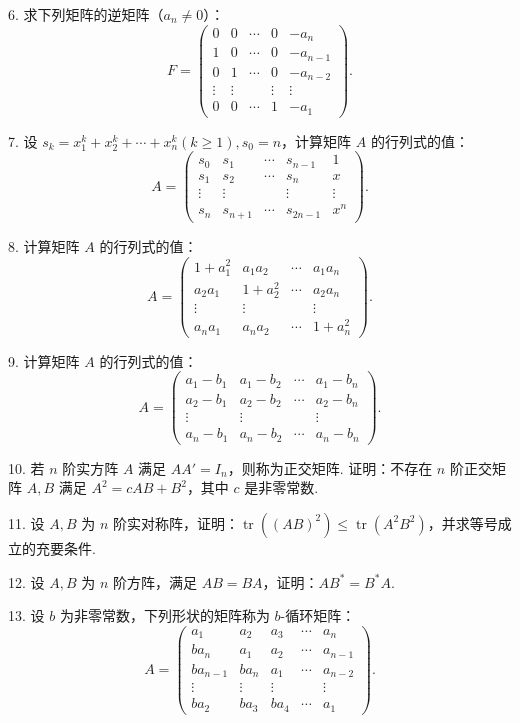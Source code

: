 \documentclass[UTF8, 12pt, fontset=fandol, oneside]{ctexart}
\begin{document}
6. 求下列矩阵的逆矩阵（$a_n\ne0$）：
\[
F=
\left(
\begin{array}{ccccc}
0 & 0 & \cdots & 0 & -a_n\\
1 & 0 & \cdots & 0 & -a_{n-1}\\
0 & 1 & \cdots & 0 & -a_{n-2}\\
\vdots & \vdots & & \vdots & \vdots\\
0 & 0 & \cdots & 1 & -a_1
\end{array}
\right).
\]

7. 设 $s_k=x_1^k+x_2^k+\cdots+x_n^k(k\ge1),s_0=n$，计算矩阵 $A$ 的行列式的值：
\[
A=
\left(
\begin{array}{ccccc}
s_0 & s_1 & \cdots & s_{n-1} & 1\\
s_1 & s_2 & \cdots & s_n & x\\
\vdots & \vdots & & \vdots & \vdots\\
s_n & s_{n+1} & \cdots & s_{2n-1} & x^n
\end{array}
\right).
\]

8. 计算矩阵 $A$ 的行列式的值：
\[
A=
\left(
\begin{array}{cccc}
1+a_1^2 & a_1a_2 & \cdots & a_1a_n\\
a_2a_1 & 1+a_2^2 & \cdots & a_2a_n\\
\vdots & \vdots & & \vdots\\
a_na_1 & a_na_2 & \cdots & 1+a_n^2
\end{array}
\right).
\]

9. 计算矩阵 $A$ 的行列式的值：
\[
A=
\left(
\begin{array}{cccc}
a_1-b_1 & a_1-b_2 & \cdots & a_1-b_n\\
a_2-b_1 & a_2-b_2 & \cdots & a_2-b_n\\
\vdots & \vdots & & \vdots\\
a_n-b_1 & a_n-b_2 & \cdots & a_n-b_n
\end{array}
\right).
\]

10. 若 $n$ 阶实方阵 $A$ 满足 $AA'=I_n$，则称为正交矩阵. 证明：不存在 $n$ 阶正交矩阵 $A,B$ 满足 $A^2=cAB+B^2$，其中 $c$ 是非零常数.

11. 设 $A,B$ 为 $n$ 阶实对称阵，证明：$\operatorname{tr}((AB)^2)\le\operatorname{tr}(A^2B^2)$，并求等号成立的充要条件.

12. 设 $A,B$ 为 $n$ 阶方阵，满足 $AB=BA$，证明：$AB^*=B^*A$.

13. 设 $b$ 为非零常数，下列形状的矩阵称为 $b$-循环矩阵：
\[
A=
\left(
\begin{array}{ccccc}
a_1 & a_2 & a_3 & \cdots & a_n\\
ba_n & a_1 & a_2 & \cdots & a_{n-1}\\
ba_{n-1} & ba_n & a_1 & \cdots & a_{n-2}\\
\vdots & \vdots & \vdots & & \vdots\\
ba_2 & ba_3 & ba_4 & \cdots & a_1
\end{array}
\right).
\]
\end{document}

